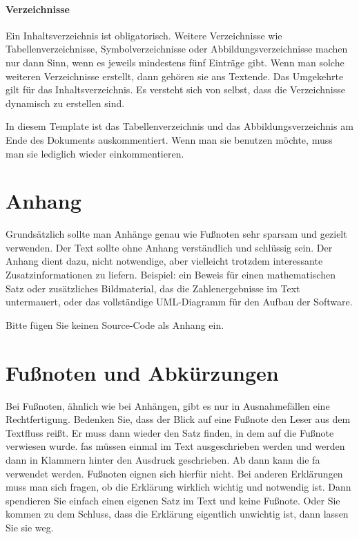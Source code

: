 {\paragraph{Verzeichnisse}
Ein Inhaltsverzeichnis ist obligatorisch. Weitere Verzeichnisse wie Tabellenverzeichnisse, Symbolverzeichnisse oder Abbildungsverzeichnisse machen nur dann Sinn, wenn es jeweils mindestens fünf Einträge gibt.
Wenn man solche weiteren Verzeichnisse erstellt, dann gehören sie ans Textende.
Das Umgekehrte gilt für das Inhaltsverzeichnis.
Es versteht sich von selbst, dass die Verzeichnisse dynamisch zu erstellen sind.

In diesem Template ist das Tabellenverzeichnis und das Abbildungsverzeichnis am Ende des Dokuments auskommentiert.
Wenn man sie benutzen möchte, muss man sie lediglich wieder einkommentieren.

\section{Anhang}

Grundsätzlich sollte man Anhänge genau wie Fußnoten sehr sparsam und gezielt verwenden.
Der Text sollte ohne Anhang verständlich und schlüssig sein.
Der Anhang dient dazu, nicht notwendige, aber vielleicht trotzdem interessante Zusatzinformationen zu liefern.
Beispiel: ein Beweis für einen mathematischen Satz oder zusätzliches Bildmaterial, das die Zahlenergebnisse im Text untermauert, oder das vollständige UML-Diagramm für den Aufbau der Software.

Bitte fügen Sie keinen Source-Code als Anhang ein.

\section{Fußnoten und Abkürzungen}

Bei Fußnoten, ähnlich wie bei Anhängen, gibt es nur in Ausnahmefällen eine Rechtfertigung.
Bedenken Sie, dass der Blick auf eine Fußnote den Leser aus dem Textfluss reißt.
Er muss dann wieder den Satz finden, in dem auf die Fußnote verwiesen wurde. \Acp{fa} müssen einmal im Text ausgeschrieben werden und werden dann in Klammern hinter den Ausdruck geschrieben.
Ab dann kann die \ac{fa} verwendet werden. Fußnoten eignen sich hierfür nicht.
Bei anderen Erklärungen muss man sich fragen, ob die Erklärung wirklich wichtig und notwendig ist.
Dann spendieren Sie einfach einen eigenen Satz im Text und keine Fußnote.
Oder Sie kommen zu dem Schluss, dass die Erklärung eigentlich unwichtig ist, dann lassen Sie sie weg.

}
